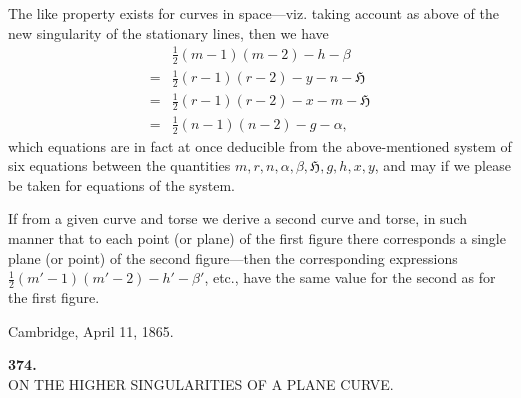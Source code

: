 \documentclass[11pt]{article}
\begin{document}
The like property exists for curves in space---viz. taking account as above of the new singularity of the stationary lines, then we have
\begin{align*}
&\tfrac{1}{2}(m-1)(m-2) - h - \beta\\
={}&\tfrac{1}{2}(r-1)(r-2) - y - n - \mathfrak{H}\\
={}&\tfrac{1}{2}(r-1)(r-2) - x - m - \mathfrak{H}\\
={}&\tfrac{1}{2}(n-1)(n-2) - g - \alpha,
\end{align*}
which equations are in fact at once deducible from the above-mentioned system of six equations between the quantities $m, r, n, \alpha, \beta, \mathfrak{H}, g, h, x, y$, and may if we please be taken for equations of the system.

If from a given curve and torse we derive a second curve and torse, in such manner that to each point (or plane) of the first figure there corresponds a single plane (or point) of the second figure---then the corresponding expressions $\tfrac{1}{2}(m'-1)(m'-2) - h' - \beta'$, etc., have the same value for the second as for the first figure.

\medskip\noindent Cambridge, April 11, 1865.

\bigskip

\begin{center}\textbf{374.}\\[2pt]
ON THE HIGHER SINGULARITIES OF A PLANE CURVE.\end{center}


\medskip
\end{document}
